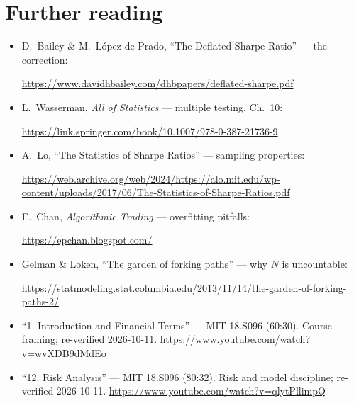 \section*{Further reading}
\begin{itemize}
\item D.~Bailey \& M.~L\'opez de Prado, ``The Deflated Sharpe Ratio'' --- the correction:

\url{https://www.davidhbailey.com/dhbpapers/deflated-sharpe.pdf}
\item L.~Wasserman, \emph{All of Statistics} --- multiple testing, Ch.~10:

\url{https://link.springer.com/book/10.1007/978-0-387-21736-9}
\item A.~Lo, ``The Statistics of Sharpe Ratios'' --- sampling properties:

\url{https://web.archive.org/web/2024/https://alo.mit.edu/wp-content/uploads/2017/06/The-Statistics-of-Sharpe-Ratios.pdf}
\item E.~Chan, \emph{Algorithmic Trading} --- overfitting pitfalls:

\url{https://epchan.blogspot.com/}
\item Gelman \& Loken, ``The garden of forking paths'' --- why $N$ is uncountable:

\url{https://statmodeling.stat.columbia.edu/2013/11/14/the-garden-of-forking-paths-2/}
\end{itemize}

\begin{rulebox}
\begin{itemize}
\item ``1. Introduction and Financial Terms'' --- MIT 18.S096 (60:30). Course framing;
re-verified 2026-10-11.
\url{https://www.youtube.com/watch?v=wvXDB9dMdEo}
\item ``12. Risk Analysis'' --- MIT 18.S096 (80:32). Risk and model discipline; re-verified
2026-10-11.
\url{https://www.youtube.com/watch?v=qlytPllimpQ}
\end{itemize}
\end{rulebox}
